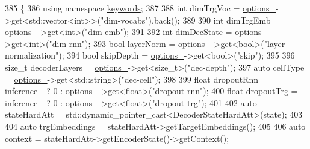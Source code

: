 \begin{DoxyCode}
385                                                           \{
386     \textcolor{keyword}{using namespace }\hyperlink{namespacekeywords}{keywords};
387 
388     \textcolor{keywordtype}{int} dimTrgVoc = \hyperlink{classmarian_1_1DecoderBase_a75375e7661a014fd15bbee3b0a047b91}{options\_}->get<std::vector<int>>(\textcolor{stringliteral}{"dim-vocabs"}).back();
389 
390     \textcolor{keywordtype}{int} dimTrgEmb = \hyperlink{classmarian_1_1DecoderBase_a75375e7661a014fd15bbee3b0a047b91}{options\_}->get<\textcolor{keywordtype}{int}>(\textcolor{stringliteral}{"dim-emb"});
391 
392     \textcolor{keywordtype}{int} dimDecState = \hyperlink{classmarian_1_1DecoderBase_a75375e7661a014fd15bbee3b0a047b91}{options\_}->get<\textcolor{keywordtype}{int}>(\textcolor{stringliteral}{"dim-rnn"});
393     \textcolor{keywordtype}{bool} layerNorm = \hyperlink{classmarian_1_1DecoderBase_a75375e7661a014fd15bbee3b0a047b91}{options\_}->get<\textcolor{keywordtype}{bool}>(\textcolor{stringliteral}{"layer-normalization"});
394     \textcolor{keywordtype}{bool} skipDepth = \hyperlink{classmarian_1_1DecoderBase_a75375e7661a014fd15bbee3b0a047b91}{options\_}->get<\textcolor{keywordtype}{bool}>(\textcolor{stringliteral}{"skip"});
395 
396     \textcolor{keywordtype}{size\_t} decoderLayers = \hyperlink{classmarian_1_1DecoderBase_a75375e7661a014fd15bbee3b0a047b91}{options\_}->get<\textcolor{keywordtype}{size\_t}>(\textcolor{stringliteral}{"dec-depth"});
397     \textcolor{keyword}{auto} cellType = \hyperlink{classmarian_1_1DecoderBase_a75375e7661a014fd15bbee3b0a047b91}{options\_}->get<std::string>(\textcolor{stringliteral}{"dec-cell"});
398 
399     \textcolor{keywordtype}{float} dropoutRnn = \hyperlink{classmarian_1_1DecoderBase_a808975d515f60a53096f6794c3dc61d4}{inference\_} ? 0 : \hyperlink{classmarian_1_1DecoderBase_a75375e7661a014fd15bbee3b0a047b91}{options\_}->get<\textcolor{keywordtype}{float}>(\textcolor{stringliteral}{"dropout-rnn"});
400     \textcolor{keywordtype}{float} dropoutTrg = \hyperlink{classmarian_1_1DecoderBase_a808975d515f60a53096f6794c3dc61d4}{inference\_} ? 0 : \hyperlink{classmarian_1_1DecoderBase_a75375e7661a014fd15bbee3b0a047b91}{options\_}->get<\textcolor{keywordtype}{float}>(\textcolor{stringliteral}{"dropout-trg"});
401 
402     \textcolor{keyword}{auto} stateHardAtt = std::dynamic\_pointer\_cast<DecoderStateHardAtt>(state);
403 
404     \textcolor{keyword}{auto} trgEmbeddings = stateHardAtt->getTargetEmbeddings();
405 
406     \textcolor{keyword}{auto} context = stateHardAtt->getEncoderState()->getContext();

\end{DoxyCode}

